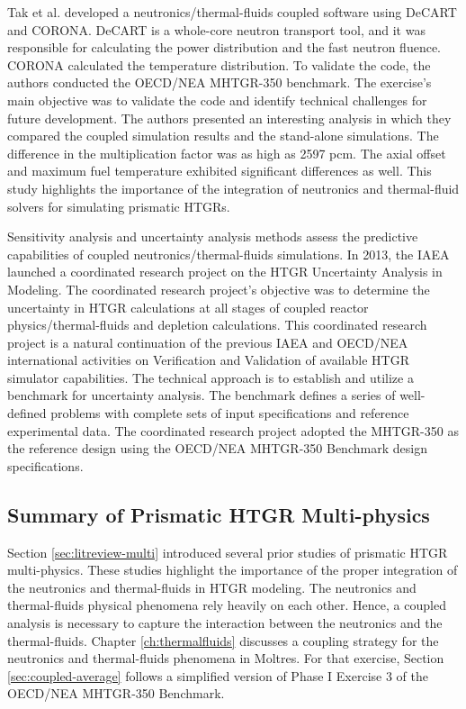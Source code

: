 Tak et al. \cite{tak_coupled_2016} developed a neutronics/thermal-fluids coupled software using DeCART \cite{kaeri_decart_2007} and CORONA.
DeCART is a whole-core neutron transport tool, and it was responsible for calculating the power distribution and the fast neutron fluence.
CORONA calculated the temperature distribution.
To validate the code, the authors conducted the OECD/NEA MHTGR-350 benchmark.
The exercise's main objective was to validate the code and identify technical challenges for future development.
The authors presented an interesting analysis in which they compared the coupled simulation results and the stand-alone simulations.
The difference in the multiplication factor was as high as 2597 pcm.
The axial offset and maximum fuel temperature exhibited significant differences as well.
This study highlights the importance of the integration of neutronics and thermal-fluid solvers for simulating prismatic HTGRs.

Sensitivity analysis and uncertainty analysis methods assess the predictive capabilities of coupled neutronics/thermal-fluids simulations.
In 2013, the IAEA launched a coordinated research project \cite{tyobeka_htgr_2011} on the HTGR Uncertainty Analysis in Modeling.
The coordinated research project's objective was to determine the uncertainty in HTGR calculations at all stages of coupled reactor physics/thermal-fluids and depletion calculations.
This coordinated research project is a natural continuation of the previous IAEA and OECD/NEA international activities \cite{iaea_evaluation_2003}\cite{reitsma_oecd-neansc_2008} on Verification and Validation of available HTGR simulator capabilities.
The technical approach is to establish and utilize a benchmark for uncertainty analysis.
The benchmark defines a series of well-defined problems with complete sets of input specifications and reference experimental data.
The coordinated research project adopted the MHTGR-350 as the reference design using the OECD/NEA MHTGR-350 Benchmark \cite{oecd_nea_benchmark_2017} design specifications.

\subsection{Summary of Prismatic HTGR Multi-physics}

Section \ref{sec:litreview-multi} introduced several prior studies of prismatic HTGR multi-physics.
These studies highlight the importance of the proper integration of the neutronics and thermal-fluids in HTGR modeling.
The neutronics and thermal-fluids physical phenomena rely heavily on each other.
Hence, a coupled analysis is necessary to capture the interaction between the neutronics and the thermal-fluids.
Chapter \ref{ch:thermalfluids} discusses a coupling strategy for the neutronics and thermal-fluids phenomena in Moltres.
For that exercise, Section \ref{sec:coupled-average} follows a simplified version of Phase I Exercise 3 of the OECD/NEA MHTGR-350 Benchmark.
